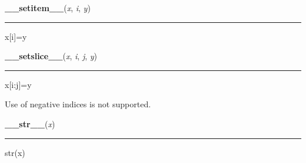     \label{list:__setitem__}

    \vspace{0.5ex}

    \begin{boxedminipage}{\textwidth}

    \raggedright \textbf{\_\_setitem\_\_}(\textit{x}, \textit{i}, \textit{y})

    \vspace{-1.5ex}

    \rule{\textwidth}{0.5\fboxrule}

x{[}i{]}=y
    \vspace{1ex}

    \end{boxedminipage}

    \label{list:__setslice__}

    \vspace{0.5ex}

    \begin{boxedminipage}{\textwidth}

    \raggedright \textbf{\_\_setslice\_\_}(\textit{x}, \textit{i}, \textit{j}, \textit{y})

    \vspace{-1.5ex}

    \rule{\textwidth}{0.5\fboxrule}

x{[}i:j{]}=y

Use  of negative indices is not supported.
    \vspace{1ex}

    \end{boxedminipage}

    \label{object:__str__}

    \vspace{0.5ex}

    \begin{boxedminipage}{\textwidth}

    \raggedright \textbf{\_\_str\_\_}(\textit{x})

    \vspace{-1.5ex}

    \rule{\textwidth}{0.5\fboxrule}

str(x)
    \vspace{1ex}

    \end{boxedminipage}

